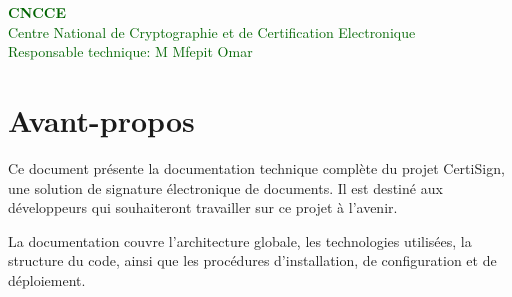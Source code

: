 \documentclass[a4paper,12pt]{report}
\begin{document}
\begin{titlepage}
\begin{center}
        \begin{tcolorbox}[width=0.7\textwidth, colback=white, colframe=maingreen!40, arc=0mm, boxrule=1pt]
            \begin{center}
                {\sffamily\fontsize{14}{18}\selectfont\bfseries\textcolor{darkgreen}{CNCCE}}\\[0.2cm]
                {\sffamily\fontsize{11}{13}\selectfont\mdseries\textcolor{darkgreen}{Centre National de Cryptographie et de Certification Electronique}}\\[0.5cm]
                
                {\sffamily\fontsize{12}{14}\selectfont\mdseries\textcolor{darkgreen}{Responsable technique: M Mfepit Omar}}\\[0.2cm]                
            \end{center}
        \end{tcolorbox}
        
        \vfill
        
        {\sffamily\fontsize{14}{16}\selectfont\mdseries\textcolor{white}{
        }}
    \end{center}
\end{titlepage}

\chapter*{Avant-propos}

\begin{tcolorbox}[title=À propos de cette documentation]
Ce document présente la documentation technique complète du projet CertiSign, une solution de signature électronique de documents. Il est destiné aux développeurs qui souhaiteront travailler sur ce projet à l'avenir.

La documentation couvre l'architecture globale, les technologies utilisées, la structure du code, ainsi que les procédures d'installation, de configuration et de déploiement.
\end{tcolorbox}

\tableofcontents
\end{document}
